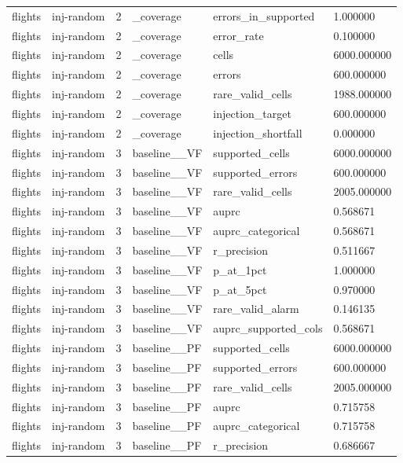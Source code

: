 \begin{tabular}{llllll}
flights & inj-random & 2 & \_coverage & errors\_in\_supported & 1.000000 \\
flights & inj-random & 2 & \_coverage & error\_rate & 0.100000 \\
flights & inj-random & 2 & \_coverage & cells & 6000.000000 \\
flights & inj-random & 2 & \_coverage & errors & 600.000000 \\
flights & inj-random & 2 & \_coverage & rare\_valid\_cells & 1988.000000 \\
flights & inj-random & 2 & \_coverage & injection\_target & 600.000000 \\
flights & inj-random & 2 & \_coverage & injection\_shortfall & 0.000000 \\
flights & inj-random & 3 & baseline\_\_VF & supported\_cells & 6000.000000 \\
flights & inj-random & 3 & baseline\_\_VF & supported\_errors & 600.000000 \\
flights & inj-random & 3 & baseline\_\_VF & rare\_valid\_cells & 2005.000000 \\
flights & inj-random & 3 & baseline\_\_VF & auprc & 0.568671 \\
flights & inj-random & 3 & baseline\_\_VF & auprc\_categorical & 0.568671 \\
flights & inj-random & 3 & baseline\_\_VF & r\_precision & 0.511667 \\
flights & inj-random & 3 & baseline\_\_VF & p\_at\_1pct & 1.000000 \\
flights & inj-random & 3 & baseline\_\_VF & p\_at\_5pct & 0.970000 \\
flights & inj-random & 3 & baseline\_\_VF & rare\_valid\_alarm & 0.146135 \\
flights & inj-random & 3 & baseline\_\_VF & auprc\_supported\_cols & 0.568671 \\
flights & inj-random & 3 & baseline\_\_PF & supported\_cells & 6000.000000 \\
flights & inj-random & 3 & baseline\_\_PF & supported\_errors & 600.000000 \\
flights & inj-random & 3 & baseline\_\_PF & rare\_valid\_cells & 2005.000000 \\
flights & inj-random & 3 & baseline\_\_PF & auprc & 0.715758 \\
flights & inj-random & 3 & baseline\_\_PF & auprc\_categorical & 0.715758 \\
flights & inj-random & 3 & baseline\_\_PF & r\_precision & 0.686667 \\

\end{tabular}
